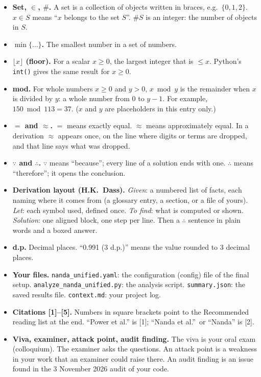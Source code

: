 \documentclass[11pt,a4paper,oneside,openany]{report}
\newcommand{\code}[1]{\texttt{#1}}
\newcommand{\gl}[1]{\textbf{#1}}   %
\newenvironment{glist}{\begin{itemize}\setlength{\itemsep}{2pt}\setlength{\parskip}{1pt}}{\end{itemize}}
\begin{document}
\begin{glist}
\item[\gl{A1}] \textbf{Set, $\in$, $\#$.} A set is a collection of objects written in braces, e.g.\ $\{0, 1, 2\}$. $x \in S$ means ``$x$ belongs to the set $S$''. $\#S$ is an integer: the number of objects in $S$.
\item[\gl{A2}] \textbf{$\min\{\ldots\}$.} The smallest number in a set of numbers.
\item[\gl{A3}] \textbf{$\lfloor x \rfloor$ (floor).} For a scalar $x \ge 0$, the largest integer that is $\le x$. Python's \code{int()} gives the same result for $x \ge 0$.
\item[\gl{A4}] \textbf{mod.} For whole numbers $x \ge 0$ and $y > 0$, $x \bmod y$ is the remainder when $x$ is divided by $y$: a whole number from $0$ to $y - 1$. For example, $150 \bmod 113 = 37$. ($x$ and $y$ are placeholders in this entry only.)
\item[\gl{A5}] \textbf{$=$ and $\approx$.} $=$ means exactly equal. $\approx$ means approximately equal. In a derivation $\approx$ appears once, on the line where digits or terms are dropped, and that line says what was dropped.
\item[\gl{A6}] \textbf{$\because$ and $\therefore$.} $\because$ means ``because''; every line of a solution ends with one. $\therefore$ means ``therefore''; it opens the conclusion.
\item[\gl{A7}] \textbf{Derivation layout (H.K.\ Dass).} \emph{Given}: a numbered list of facts, each naming where it comes from (a glossary entry, a section, or a file of yours). \emph{Let}: each symbol used, defined once. \emph{To find}: what is computed or shown. \emph{Solution}: one aligned block, one step per line. Then a $\therefore$ sentence in plain words and a boxed answer.
\item[\gl{A8}] \textbf{d.p.} Decimal places. ``0.991 (3 d.p.)'' means the value rounded to 3 decimal places.
\item[\gl{A9}] \textbf{Your files.} \code{nanda\_\allowbreak{}unified.yaml}: the configuration (config) file of the final setup. \code{analyze\_\allowbreak{}nanda\_\allowbreak{}unified.py}: the analysis script. \code{summary.json}: the saved results file. \code{context.md}: your project log.
\item[\gl{A10}] \textbf{Citations [1]--[5].} Numbers in square brackets point to the Recommended reading list at the end. ``Power et al.'' is [1]; ``Nanda et al.''\ or ``Nanda'' is [2].
\item[\gl{A11}] \textbf{Viva, examiner, attack point, audit finding.} The viva is your oral exam (colloquium). The examiner asks the questions. An attack point is a weakness in your work that an examiner could raise there. An audit finding is an issue found in the 3 November 2026 audit of your code.
\end{glist}
\end{document}
